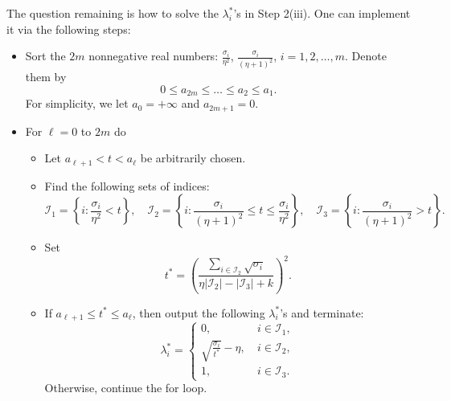 {\medskip
\noindent
The question remaining is how to solve the $\lambda_i^*$'s in Step 2(iii). One can implement it via the following steps:
\begin{itemize}
    \item[(i)] Sort the $2m$ nonnegative real numbers: $\frac{\sigma_i}{\eta^2}$, $\frac{\sigma_i}{(\eta+1)^2}$, $i=1,2,\dots,m$. Denote them by 
    $$ 0 \leq a_{2m} \leq \dots \leq a_2 \leq a_1. $$
    For simplicity, we let $a_0 = +\infty$ and $a_{2m+1} = 0$.
    \item[(ii)] For $\ell=0$ to $2m$ do
        \begin{itemize}
            \item[(a)] Let $a_{\ell+1}<t<a_\ell$ be arbitrarily chosen. 
            \item[(b)] Find the following sets of indices:
            $$ \mathcal{I}_1=\left\{i:\frac{\sigma_i}{\eta^2}<t\right\}, \quad \mathcal{I}_2 = \left\{i:\frac{\sigma_i}{(\eta+1)^2}\leq t \leq \frac{\sigma_i}{\eta^2}\right\}, \quad \mathcal{I}_3 = \left\{i: \frac{\sigma_i}{(\eta+1)^2} > t\right\}. $$
            \item[(c)] Set 
            $$ t^* = \left(\frac{\sum_{i\in\mathcal{I}_2}\sqrt{\sigma_i}}{\eta|\mathcal{I}_2| - |\mathcal{I}_3| + k}\right)^2. $$
            \item[(d)] If $a_{\ell+1} \leq t^* \leq a_\ell$, then output the following $\lambda_i^*$'s and terminate:
            \begin{equation}
                \label{eq:lambda-star}
                \lambda_i^* = \left\{
                \begin{array}{cc}
                0, & \ i\in\mathcal{I}_1, \\
                \sqrt{\frac{\sigma_i}{t^*}} - \eta, & \ i\in\mathcal{I}_2, \\
                1, & \ i\in\mathcal{I}_3.
                \end{array}\right.
            \end{equation}
            Otherwise, continue the for loop.
        \end{itemize}
\end{itemize}

}
